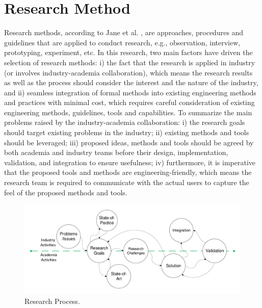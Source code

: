 \chapter{Research Method}
\label{methods}
Research methods, according to Jane et al. \cite{qualitateiveresearch2012}, are approaches, procedures and guidelines that are applied to conduct research, e.g., observation, interview, prototyping, experiment, etc. In this research, two main factors have driven the selection of research methods: i) the fact that the research is applied in industry (or involves industry-academia collaboration), which means the research results as well as the process should consider the interest and the nature of the industry, and ii) seamless integration of formal methods into existing engineering methods and practices with minimal cost, which requires careful consideration of existing engineering methods, guidelines, tools and capabilities. To summarize the main problems raised by the industry-academia collaboration: i) the research goals should target existing problems in the industry; ii) existing methods and tools should be leveraged; iii) proposed ideas, methods and tools should be agreed by both academia and industry teams before their design, implementation, validation, and integration to ensure usefulness; iv) furthermore, it is imperative that the proposed tools and methods are engineering-friendly, which means the research team is required to communicate with the actual users to capture the feel of the proposed methods and tools. 
\begin{figure}[h]
	\centering
	\includegraphics[trim=10 0 10 0, clip,width=1\linewidth]{images/research_process.pdf}
	\caption{Research Process.}
	\label{fig_research_process}
\end{figure}

